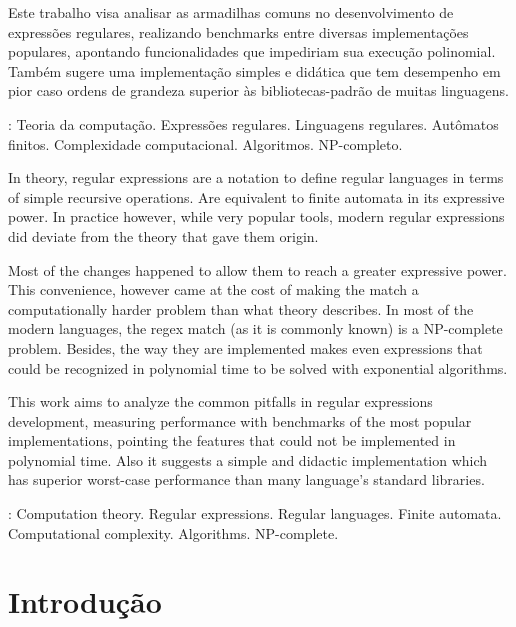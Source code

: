 \documentclass[a4paper,12pt,oneside,onecolumn]{uerj}
\begin{document}
Este trabalho visa analisar as armadilhas comuns no desenvolvimento de expressões regulares, realizando benchmarks entre diversas implementações populares, apontando funcionalidades que impediriam sua execução polinomial. Também sugere uma implementação simples e didática que tem desempenho em pior caso ordens de grandeza superior às bibliotecas-padrão de muitas linguagens.

: Teoria da computação. Expressões regulares. Linguagens regulares. Autômatos finitos. Complexidade computacional. Algoritmos. NP-completo.



In theory, regular expressions are a notation to define regular languages in terms of simple recursive operations. Are equivalent to finite automata in its expressive power. In practice however, while very popular tools, modern regular expressions did deviate from the theory that gave them origin.

Most of the changes happened to allow them to reach a greater expressive power. This convenience, however came at the cost of making the match a computationally harder problem than what theory describes. In most of the modern languages, the regex match (as it is commonly known) is a NP-complete problem. Besides, the way they are implemented makes even expressions that could be recognized in polynomial time to be solved with exponential algorithms.

This work aims to analyze the common pitfalls in regular expressions development, measuring performance with benchmarks of the most popular implementations, pointing the features that could not be implemented in polynomial time. Also it suggests a simple and didactic implementation which has superior worst-case performance than many language's standard libraries.

: Computation theory. Regular expressions. Regular languages. Finite automata. Computational complexity. Algorithms. NP-complete.

\listadefiguras

\sumario

\mainmatter

\chapter{Introdução}
\end{document}
